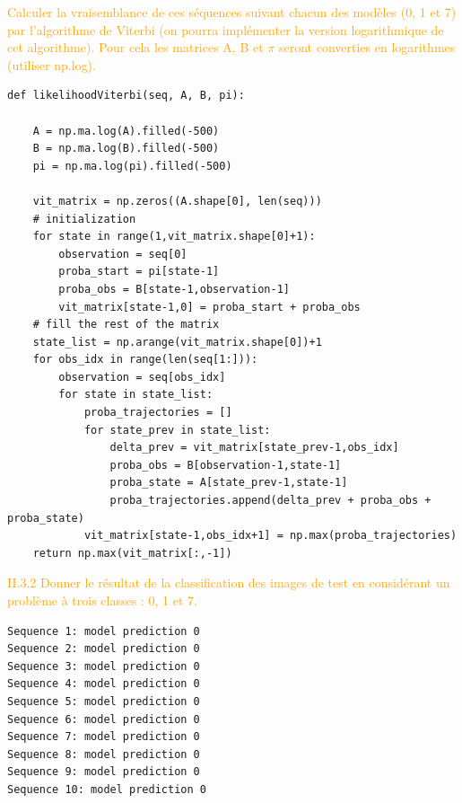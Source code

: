 \documentclass[11pt,a4paper,fleqn]{article}
\begin{document}
\vspace{5mm}
\textcolor{orange}{Calculer la vraisemblance de ces séquences suivant chacun des modèles (0, 1 et 7) par l’algorithme de Viterbi (on pourra implémenter la version logarithmique de cet algorithme). Pour cela les matrices A, B et $\pi$ seront converties en logarithmes (utiliser np.log).}

\lstset{language=Python}
\lstset{frame=lines}
\lstset{basicstyle=\footnotesize}
\begin{lstlisting}
def likelihoodViterbi(seq, A, B, pi):

    A = np.ma.log(A).filled(-500)
    B = np.ma.log(B).filled(-500)
    pi = np.ma.log(pi).filled(-500)

    vit_matrix = np.zeros((A.shape[0], len(seq)))
    # initialization
    for state in range(1,vit_matrix.shape[0]+1):
        observation = seq[0]
        proba_start = pi[state-1]
        proba_obs = B[state-1,observation-1]
        vit_matrix[state-1,0] = proba_start + proba_obs
    # fill the rest of the matrix
    state_list = np.arange(vit_matrix.shape[0])+1
    for obs_idx in range(len(seq[1:])):
        observation = seq[obs_idx]
        for state in state_list:
            proba_trajectories = []
            for state_prev in state_list:
                delta_prev = vit_matrix[state_prev-1,obs_idx]
                proba_obs = B[observation-1,state-1]
                proba_state = A[state_prev-1,state-1]
                proba_trajectories.append(delta_prev + proba_obs + proba_state)
            vit_matrix[state-1,obs_idx+1] = np.max(proba_trajectories)
    return np.max(vit_matrix[:,-1])
\end{lstlisting}

\vspace{5mm}
\textcolor{orange}{II.3.2 Donner le résultat de la classification des images de test en considérant un problème à trois classes : 0, 1 et 7.}

\lstset{language=Python}
\lstset{frame=lines}
\lstset{basicstyle=\footnotesize}
\begin{lstlisting}
Sequence 1: model prediction 0
Sequence 2: model prediction 0
Sequence 3: model prediction 0
Sequence 4: model prediction 0
Sequence 5: model prediction 0
Sequence 6: model prediction 0
Sequence 7: model prediction 0
Sequence 8: model prediction 0
Sequence 9: model prediction 0
Sequence 10: model prediction 0
\end{lstlisting}
\end{document}
